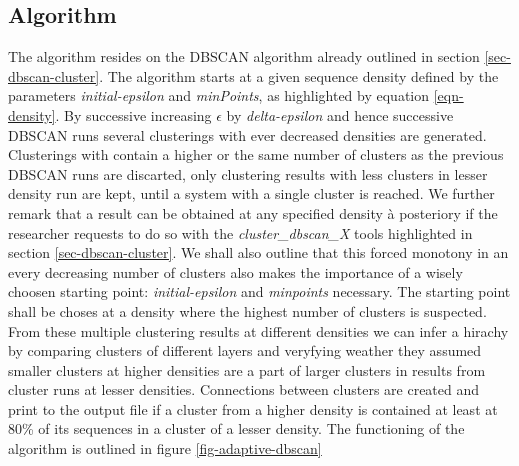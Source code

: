 \subsection{Algorithm}

The algorithm resides on the DBSCAN algorithm already outlined in
section \ref{sec-dbscan-cluster}. The algorithm starts at a given
sequence density defined by the parameters \emph{initial-epsilon} and
\emph{minPoints}, as highlighted by equation \ref{eqn-density}. By
successive increasing $\epsilon$ by \emph{delta-epsilon} and hence
successive DBSCAN runs several clusterings with ever decreased
densities are generated. Clusterings with contain a higher or the same
number of clusters as the previous DBSCAN runs are discarted, only
clustering results with less clusters in lesser density run are kept,
until a system with a single cluster is reached. We further remark
that a result can be obtained at any specified density à posteriory if
the researcher requests to do so with the \emph{cluster\_dbscan\_X}
tools highlighted in section \ref{sec-dbscan-cluster}. We shall also
outline that this forced monotony in an every decreasing number of
clusters also makes the importance of a wisely choosen starting point:
\emph{initial-epsilon} and \emph{minpoints} necessary. The starting
point shall be choses at a density where the highest number of
clusters is suspected.
From these multiple clustering results at different densities we can
infer a hirachy by comparing clusters of different layers and
veryfying weather they assumed smaller clusters at higher densities
are a part of larger clusters in results from cluster runs at lesser
densities. Connections between clusters are created and print to the
output file if a cluster from a higher density is contained at least
at 80\% of its sequences in a cluster of a lesser density. The
functioning of the algorithm is outlined in figure
\ref{fig-adaptive-dbscan}
